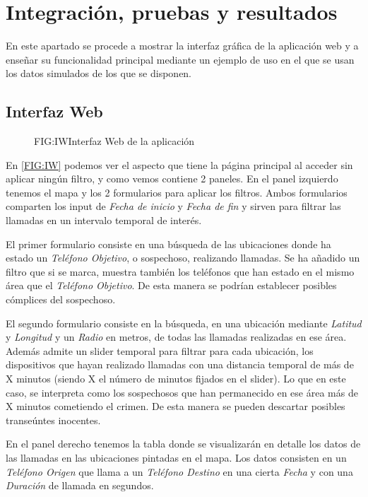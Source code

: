 \chapter{Integración, pruebas y resultados\label{CAP:IPR}}
  En este apartado se procede a mostrar la interfaz gráfica de la aplicación web y a enseñar su funcionalidad principal mediante un ejemplo de uso en el que se usan los datos simulados de los que se disponen.
  
  \section{Interfaz Web}
    
    \begin{figure}[Interfaz Web de la aplicación]{FIG:IW}{Interfaz Web de la aplicación}
    \end{figure}
    
    En \ref{FIG:IW} podemos ver el aspecto que tiene la página principal al acceder sin aplicar ningún filtro, y como vemos contiene 2 paneles. 
    En el panel izquierdo tenemos el mapa y los 2 formularios para aplicar los filtros. Ambos formularios comparten los input de \textit{Fecha de inicio} y \textit{Fecha de fin} y sirven para filtrar las llamadas en un intervalo temporal de interés.
    
    El primer formulario consiste en una búsqueda de las ubicaciones donde ha estado un \textit{Teléfono Objetivo}, o sospechoso, realizando llamadas. 
    Se ha añadido un filtro que si se marca, muestra también los teléfonos que han estado en el mismo área que el \textit{Teléfono Objetivo}. De esta manera se podrían establecer posibles cómplices del sospechoso.
  
    El segundo formulario consiste en la búsqueda, en una ubicación mediante \textit{Latitud} y \textit{Longitud} y un \textit{Radio} en metros, de todas las llamadas realizadas en ese área.
    Además admite un slider temporal para filtrar para cada ubicación, los dispositivos que hayan realizado llamadas con una distancia temporal de más de X minutos (siendo X el número de minutos fijados en el slider). Lo que en este caso, se interpreta como los sospechosos que han permanecido en ese área más de X minutos cometiendo el crimen. De esta manera se pueden descartar posibles transeúntes inocentes.
    
    En el panel derecho tenemos la tabla donde se visualizarán en detalle los datos de las llamadas en las ubicaciones pintadas en el mapa. Los datos consisten en un \textit{Teléfono Origen} que llama a un \textit{Teléfono Destino} en una cierta \textit{Fecha} y con una \textit{Duración} de llamada en segundos.
    
